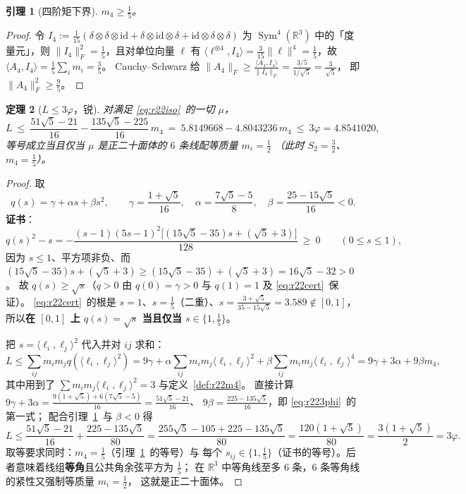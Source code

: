 \documentclass[UTF8,11pt]{ctexart}
\newtheorem{theorem}{定理}[section]
\newtheorem{lemma}[theorem]{引理}
\theoremstyle{definition}
\newcommand{\R}{\mathbb{R}}
\begin{document}
\begin{lemma}[四阶矩下界]\label{lem:r22m4}
$m_4\ge\frac15$。
\end{lemma}

\begin{proof}
令 $I_4:=\frac1{15}(\delta\otimes\delta\otimes\mathrm{id}+\delta\otimes\mathrm{id}\otimes\delta+\mathrm{id}\otimes\delta\otimes\delta)$
为 $\operatorname{Sym}^4(\R^3)$ 中的「度量元」，则 $\|I_4\|_F^2=\frac15$，且对单位向量 $\ell$
有 $\langle\ell^{\otimes4},I_4\rangle=\frac3{15}\|\ell\|^4=\frac15$，故 $\langle A_4,I_4\rangle=\frac15\sum_im_i=\frac35$。
Cauchy--Schwarz 给 $\|A_4\|_F\ge\frac{\langle A_4,I_4\rangle}{\|I_4\|_F}=\frac{3/5}{1/\sqrt5}=\frac3{\sqrt5}$，
即 $\|A_4\|_F^2\ge\frac95$。
\end{proof}

\begin{theorem}[$L\le3\varphi$，锐]\label{thm:r223phi}
对满足 \eqref{eq:r22iso}~的一切 $\mu$，
\begin{equation}\label{eq:r223phi}
L\ \le\ \frac{51\sqrt5-21}{16}-\frac{135\sqrt5-225}{16}\,m_4
\ =\ 5.8149668-4.8043236\,m_4\ \le\ 3\varphi=4.8541020 ,
\end{equation}
等号成立当且仅当 $\mu$ 是正二十面体的 $6$ 条线配等质量 $m_i=\frac12$
（此时 $S_2=\frac32$、$m_4=\frac15$）。
\end{theorem}

\begin{proof}
取
\[
q(s)=\gamma+\alpha s+\beta s^2,\qquad
\gamma=\frac{1+\sqrt5}{16},\quad \alpha=\frac{7\sqrt5-5}8,\quad \beta=\frac{25-15\sqrt5}{16}<0 .
\]
\textbf{证书}：
\begin{equation}\label{eq:r22cert}
q(s)^2-s=-\frac{(s-1)(5s-1)^2\bigl[(15\sqrt5-35)s+(\sqrt5+3)\bigr]}{128}\ \ge\ 0
\qquad (0\le s\le1),
\end{equation}
因为 $s\le1$、平方项非负、而 $(15\sqrt5-35)s+(\sqrt5+3)\ge(15\sqrt5-35)+(\sqrt5+3)=16\sqrt5-32>0$。
故 $q(s)\ge\sqrt s$（$q>0$ 由 $q(0)=\gamma>0$ 与 $q(1)=1$ 及 \eqref{eq:r22cert}~保证）。
\eqref{eq:r22cert}~的根是 $s=1$、$s=\frac15$（二重）、$s=\frac{3+\sqrt5}{35-15\sqrt5}=3.589\notin[0,1]$，
所以\textbf{在 $[0,1]$ 上 $q(s)=\sqrt s$ 当且仅当 $s\in\{1,\frac15\}$}。

把 $s=\langle\ell_i,\ell_j\rangle^2$ 代入并对 $ij$ 求和：
\[
L\le\sum_{ij}m_im_jq(\langle\ell_i,\ell_j\rangle^2)
=9\gamma+\alpha\sum_{ij}m_im_j\langle\ell_i,\ell_j\rangle^2+\beta\sum_{ij}m_im_j\langle\ell_i,\ell_j\rangle^4
=9\gamma+3\alpha+9\beta m_4,
\]
其中用到了 $\sum m_im_j\langle\ell_i,\ell_j\rangle^2=3$ 与定义~\ref{def:r22m4}。
直接计算 $9\gamma+3\alpha=\frac{9(1+\sqrt5)+6(7\sqrt5-5)}{16}=\frac{51\sqrt5-21}{16}$、
$9\beta=\frac{225-135\sqrt5}{16}$，即 \eqref{eq:r223phi}~的第一式；
配合引理~\ref{lem:r22m4}~与 $\beta<0$ 得
\[
L\le\frac{51\sqrt5-21}{16}+\frac{225-135\sqrt5}{80}
=\frac{255\sqrt5-105+225-135\sqrt5}{80}
=\frac{120(1+\sqrt5)}{80}=\frac{3(1+\sqrt5)}2=3\varphi .
\]
取等要求同时：$m_4=\frac15$（引理~\ref{lem:r22m4}~的等号）与
每个 $s_{ij}\in\{1,\frac15\}$（证书的等号）。后者意味着线组\textbf{等角}且公共角余弦平方为 $\frac15$；
在 $\R^3$ 中等角线至多 $6$ 条，$6$ 条等角线的紧性又强制等质量 $m_i=\frac12$，
这就是正二十面体。
\end{proof}
\end{document}
